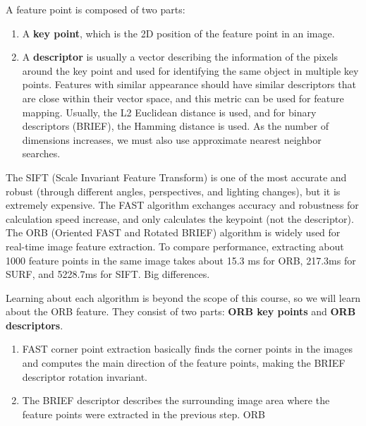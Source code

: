 \documentclass{article}
\theoremstyle{definition}
\theoremstyle{remark}
\theoremstyle{definition}
\begin{document}
A feature point is composed of two parts: 
\begin{enumerate}
    \item A \textbf{key point}, which is the 2D position of the feature point in an image. 
    \item A \textbf{descriptor} is usually a vector describing the information of the pixels around the key point and used for identifying the same object in multiple key points. Features with similar appearance should have similar descriptors that are close within their vector space, and this metric can be used for feature mapping. Usually, the L2 Euclidean distance is used, and for binary descriptors (BRIEF), the Hamming distance is used. As the number of dimensions increases, we must also use approximate nearest neighbor searches. 
\end{enumerate}

The SIFT (Scale Invariant Feature Transform) is one of the most accurate and robust (through different angles, perspectives, and lighting changes), but it is extremely expensive. The FAST algorithm exchanges accuracy and robustness for calculation speed increase, and only calculates the keypoint (not the descriptor). The ORB (Oriented FAST and Rotated BRIEF) algorithm is widely used for real-time image feature extraction. To compare performance, extracting about 1000 feature points in the same image takes about 15.3 ms for ORB, 217.3ms for SURF, and 5228.7ms for SIFT. Big differences. 

Learning about each algorithm is beyond the scope of this course, so we will learn about the ORB feature. They consist of two parts: \textbf{ORB key points} and \textbf{ORB descriptors}. 
\begin{enumerate}
    \item FAST corner point extraction basically finds the corner points in the images and computes the main direction of the feature points, making the BRIEF descriptor rotation invariant. 
    \item The BRIEF descriptor describes the surrounding image area where the feature points were extracted in the previous step. ORB 
\end{enumerate}
\end{document}
